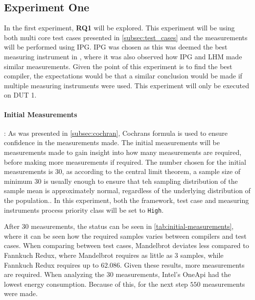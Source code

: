 \subsection{Experiment One}\label{subsec:exp_one}

In the first experiment, \textbf{RQ1} will be explored. This experiment will be using both multi core test cases presented in \cref{subsec:test_cases} and the measurements will be performed using IPG. IPG was chosen as this was deemed the best measuring instrument in \cite{biksbois}, where it was also observed how IPG and LHM made similar measurements. Given the point of this experiment is to find the best compiler, the expectations would be that a similar conclusion would be made if multiple measuring instruments were used. This experiment will only be executed on DUT 1.  

\paragraph{Initial Measurements}: As was presented in \cref{subsec:cochran}, Cochrans formula is used to ensure confidence in the measurements made. The initial measurements will be measurements made to gain insight into how many measurements are required, before making more measurements if required. The number chosen for the initial measurements is 30, as according to the central limit theorem, a sample size of minimum 30 is usually enough to ensure that teh sampling distribution of the sample mean is approximately normal, regardless of the underlying distribution of the population.\cite{central-limit-theorem}. In this experiment, both the framework, test case and measuring instruments process priority class will be set to \texttt{High}.



After 30 measurements, the status can be seen in \cref{tab:initial-measurements}, where it can be seen how the required samples varies between compilers and test cases. When comparing between test cases, Mandelbrot deviates less compared to Fannkuch Redux, where Mandelbrot requires as little as $3$ samples, while Fannkuch Redux requires up to $62.086$. Given these results, more measurements are required. When analyzing the 30 measurements, Intel's OneApi had the lowest energy consumption. Because of this, for the next step $550$ measurements were made.




